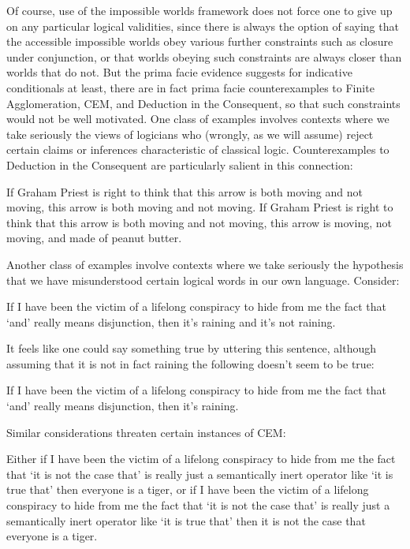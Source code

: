 \documentclass[If.tex]{subfiles}
\begin{document}
Of course, use of the impossible worlds framework does not force one to give up on any particular logical validities, since there is always the option of saying that the accessible impossible worlds obey various further constraints such as closure under conjunction, or that worlds obeying such constraints are always closer than worlds that do not.  But the prima facie evidence suggests for indicative conditionals at least, there are in fact prima facie counterexamples to Finite Agglomeration, CEM, and Deduction in the Consequent, so that such constraints would not be well motivated.  One class of examples involves contexts where we take seriously the views of logicians who (wrongly, as we will assume) reject certain claims or inferences characteristic of classical logic.  Counterexamples to Deduction in the Consequent are particularly salient in this connection:
\begin{prop}
	\nitem
	\begin{prop}
		\aitem
		If Graham Priest is right to think that this arrow is both moving and not moving, this arrow is both moving and not moving.
		\aitem
		If Graham Priest is right to think that this arrow is both moving and not moving, this arrow is moving, not moving, and made of peanut butter.
	\end{prop}
\end{prop}
Another class of examples involve contexts where we take seriously the hypothesis that we have misunderstood certain logical words in our own language.  Consider:
\begin{prop}
	\nitem
	If I have been the victim of a lifelong conspiracy to hide from me the fact that ‘and’ really means disjunction, then it's raining and it's not raining.
\end{prop}	
It feels like one could say something true by uttering this sentence, although assuming that it is not in fact raining the following doesn't seem to be true:  
\begin{prop}
	\nitem
	If I have been the victim of a lifelong conspiracy to hide from me the fact that ‘and’ really means disjunction, then it's raining.
\end{prop}
Similar considerations threaten certain instances of CEM:
\begin{prop}
	\nitem
	Either if I have been the victim of a lifelong conspiracy to hide from me the fact that ‘it is not the case that’ is really just a semantically inert operator like ‘it is true that’ then everyone is a tiger, or if I have been the victim of a lifelong conspiracy to hide from me the fact that ‘it is not the case that’ is really just a semantically inert operator like ‘it is true that’ then it is not the case that everyone is a tiger.
\end{prop}
\end{document}

